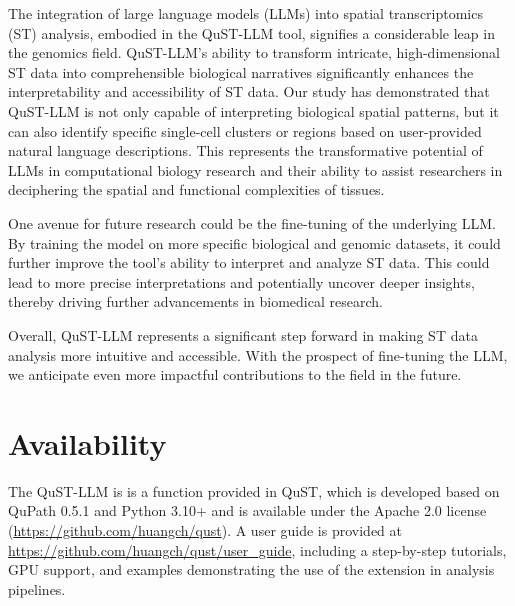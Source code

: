 \documentclass{article}
\begin{document}
The integration of large language models (LLMs) into spatial transcriptomics (ST) analysis, embodied in the QuST-LLM tool, signifies a considerable leap in the genomics field. QuST-LLM's ability to transform intricate, high-dimensional ST data into comprehensible biological narratives significantly enhances the interpretability and accessibility of ST data. Our study has demonstrated that QuST-LLM is not only capable of interpreting biological spatial patterns, but it can also identify specific single-cell clusters or regions based on user-provided natural language descriptions. This represents the transformative potential of LLMs in computational biology research and their ability to assist researchers in deciphering the spatial and functional complexities of tissues.

One avenue for future research could be the fine-tuning of the underlying LLM. By training the model on more specific biological and genomic datasets, it could further improve the tool's ability to interpret and analyze ST data. This could lead to more precise interpretations and potentially uncover deeper insights, thereby driving further advancements in biomedical research.

Overall, QuST-LLM represents a significant step forward in making ST data analysis more intuitive and accessible. With the prospect of fine-tuning the LLM, we anticipate even more impactful contributions to the field in the future.

\section{Availability}

The QuST-LLM is is a function provided in QuST, which is developed based on QuPath 0.5.1 and Python 3.10+ and is available under the Apache 2.0 license (\url{https://github.com/huangch/qust}). A user guide is provided at \url{https://github.com/huangch/qust/user_guide}, including a step-by-step tutorials, GPU support, and examples demonstrating the use of the extension in analysis pipelines.


\end{document}
